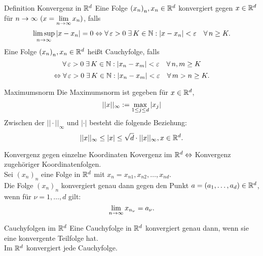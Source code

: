 \documentclass[main.tex]{subfiles}
\begin{document}
\begin{karte}{Definition Konvergenz in \( \mathbb{R}^d \)}
    Eine Folge \( {(x_n)}_n, x_n\in\mathbb{R}^d \) 
    konvergiert gegen \( x\in\mathbb{R}^d \) für 
    \( n\rightarrow \infty \ (x=\lim\limits_{n\rightarrow\infty} x_n) \), falls 
    \[ \limsup\limits_{n\rightarrow\infty} |x-x_n| 
    = 0 \Leftrightarrow \forall \varepsilon 
    > 0 \;\exists K\in\N: |x-x_n| < \varepsilon 
    \quad \forall n\geq K. \]
	Eine Folge \( {(x_n)}_n, x_n\in\mathbb{R}^d \) heißt Cauchyfolge, falls 
    \[ \forall \varepsilon>0 \;\exists K\in\N: 
    |x_n - x_m| < \varepsilon \quad \forall n,m\geq K \]
    \[ \Leftrightarrow \forall \varepsilon > 0 \;\exists K\in\N: 
    |x_n-x_m| < \varepsilon \quad \forall m>n\geq K. \]
\end{karte}
\begin{karte}{Maximumsnorm}
    Die Maximumsnorm ist gegeben für \(x\in\mathbb{R}^d\),
	\[ ||x||_\infty := \underset{1\leq j\leq d}{\max} \left| x_j \right| \]
    Zwischen der \( ||\cdot||_\infty \) und \( |\cdot| \) 
    besteht die folgende Beziehung:
    \[ ||x||_\infty \leq |x| 
    \leq \sqrt{d} \cdot ||x||_\infty, x\in\mathbb{R}^d. \]
\end{karte}
\begin{karte}{Konvergenz gegen einzelne Koordinaten}
    Kovergenz im \(\mathbb{R}^d \Leftrightarrow \) 
    Konvergenz zugehöriger Koordinatenfolgen.\\
    Sei \({(x_n)}_n\) eine Folge in \(\mathbb{R}^d\) mit 
    \(x_n = x_{n1},x_{n2},\dots,x_{nd}\).\\
    Die Folge \({(x_n)}_n\) konvergiert genau 
    dann gegen den Punkt \(a = (a_1,\dots,a_d)\in\mathbb{R}^d\), 
    wenn für \(\nu = 1,\dots,d\) gilt:
	\[ \lim\limits_{n\rightarrow\infty} x_{n_\nu} = a_\nu. \]
\end{karte}
\begin{karte}{Cauchyfolgen im \(\mathbb{R}^d\)}
    Eine Cauchyfolge in \(\mathbb{R}^d\) konvergiert genau dann, 
    wenn sie eine konvergente Teilfolge hat.\\
    Im \(\mathbb{R}^d\) konvergiert jede Cauchyfolge.
\end{karte}
\end{document}
